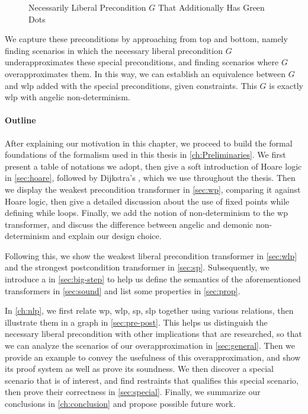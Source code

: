 \begin{enumerate}
\begin{figure}[t]
        \caption{Necessarily Liberal Precondition $G$ That Additionally Has Green Dots}
        \label{fig:intro-g}
    \end{figure}
    We capture these preconditions by approaching from top and bottom, namely finding scenarios in which the necessary liberal precondition $G$ underapproximates these special preconditions, and finding scenarios where $G$ overapproximates them. In this way, we can establish an equivalence between $G$ and wlp added with the special preconditions, given constraints. This $G$ is exactly wlp with angelic non-determinism. 
\end{enumerate}


\paragraph{Outline}
After explaining our motivation in this chapter, we proceed to build the formal foundations of the formalism used in this thesis in \autoref{ch:Preliminaries}. 
We first present a table of notations we adopt, then give a soft introduction of Hoare logic in \autoref{sec:hoare}, followed by Dijkstra's , which we use throughout the thesis. 
Then we display the weakest precondition transformer in \autoref{sec:wp}, comparing it against Hoare logic, then give a detailed discussion about the use of fixed points while defining while loops. 
Finally, we add the notion of non-determinism to the wp transformer, and discuss the difference between angelic and demonic non-determinism and explain our design choice. 

Following this, we show the weakest liberal precondition transformer in \autoref{sec:wlp} and the strongest postcondition transformer in \autoref{sec:sp}. 
Subsequently, we introduce a  in \autoref{sec:big-step} to help us define the semantics of the aforementioned transformers in \autoref{sec:sound} and list some properties in \autoref{sec:prop}.

In \autoref{ch:nlp}, we first relate wp, wlp, sp, slp together using various relations, then illustrate them in a graph in \autoref{sec:pre-post}. 
This helps us distinguish the necessary liberal precondition with other implications that are researched, so that we can analyze the scenarios of our overapproximation in \autoref{sec:general}. 
Then we provide an example to convey the usefulness of this overapproximation, and show its proof system as well as prove its soundness. 
We then discover a special scenario that is of interest, and find restraints that qualifies this special scenario, then prove their correctness in \autoref{sec:special}. 
Finally, we summarize our conclusions in \autoref{ch:conclusion} and propose possible future work. 






